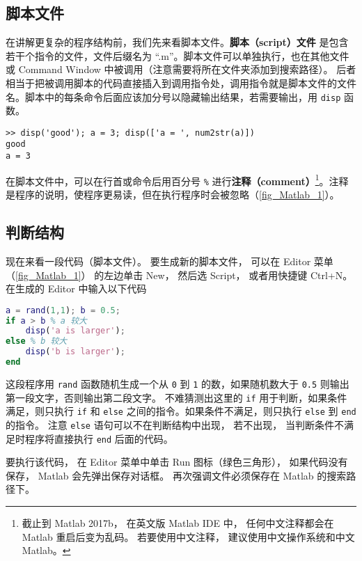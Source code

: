 

\subsection{脚本文件}
在讲解更复杂的程序结构前，我们先来看脚本文件。\textbf{脚本（script）文件} 是包含若干个指令的文件，文件后缀名为 “.m”。脚本文件可以单独执行，也在其他文件或 Command Window 中被调用（注意需要将所在文件夹添加到搜索路径）。 后者相当于把被调用脚本的代码直接插入到调用指令处，调用指令就是脚本文件的文件名。脚本中的每条命令后面应该加分号以隐藏输出结果，若需要输出，用 \verb`disp` 函数。
\begin{lstlisting}[language=matlabC]
>> disp('good'); a = 3; disp(['a = ', num2str(a)])
good
a = 3
\end{lstlisting}
在脚本文件中，可以在行首或命令后用百分号 \verb`%` 进行\textbf{注释（comment）}\footnote{截止到 Matlab 2017b， 在英文版 Matlab IDE 中， 任何中文注释都会在 Matlab 重启后变为乱码。 若要使用中文注释， 建议使用中文操作系统和中文 Matlab。}。注释是程序的说明，使程序更易读，但在执行程序时会被忽略（\autoref{fig_Matlab_1}）。

\subsection{判断结构}
现在来看一段代码（脚本文件）。 要生成新的脚本文件， 可以在 Editor 菜单（\autoref{fig_Matlab_1}） 的左边单击 New， 然后选 Script， 或者用快捷键 Ctrl+N。 在生成的 Editor 中输入以下代码

\begin{lstlisting}[language=matlab]
a = rand(1,1); b = 0.5;
if a > b % a 较大
    disp('a is larger');
else % b 较大
    disp('b is larger');
end
\end{lstlisting}

这段程序用 \verb`rand` 函数随机生成一个从 \verb`0` 到 \verb`1` 的数，如果随机数大于 \verb`0.5` 则输出第一段文字，否则输出第二段文字。 不难猜测出这里的 \verb`if` 用于判断，如果条件满足，则只执行 \verb`if` 和 \verb`else` 之间的指令。如果条件不满足，则只执行 \verb`else` 到 \verb`end` 的指令。 注意 \verb`else` 语句可以不在判断结构中出现， 若不出现， 当判断条件不满足时程序将直接执行 \verb`end` 后面的代码。

要执行该代码， 在 Editor 菜单中单击 Run 图标（绿色三角形）， 如果代码没有保存， Matlab 会先弹出保存对话框。 再次强调文件必须保存在 Matlab 的搜索路径下。

